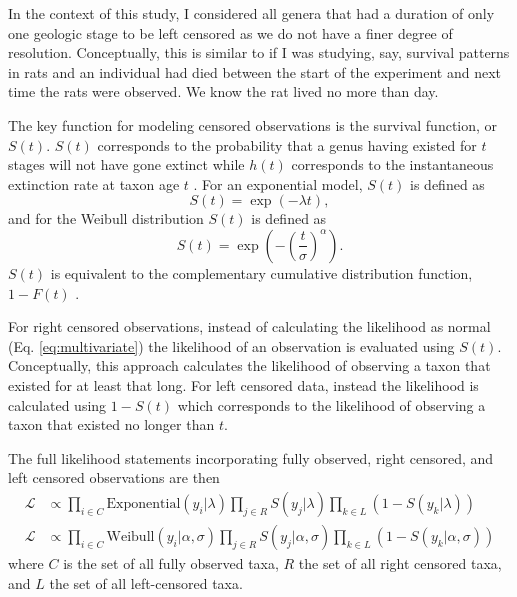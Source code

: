 \documentclass[12pt,letterpaper]{article}
\begin{document}
In the context of this study, I considered all genera that had a duration of only one geologic stage to be left censored as we do not have a finer degree of resolution. Conceptually, this is similar to if I was studying, say, survival patterns in rats and an individual had died between the start of the experiment and next time the rats were observed. We know the rat lived no more than day.

The key function for modeling censored observations is the survival function, or \(S(t)\). \(S(t)\) corresponds to the probability that a genus having existed for \(t\) stages will not have gone extinct while \(h(t)\) corresponds to the instantaneous extinction rate at taxon age \(t\) \cite{Klein2003}. For an exponential model, \(S(t)\) is defined as
\begin{equation}
  S(t) = \exp(-\lambda t),
  \label{eq:exp_surv}
\end{equation}
and for the Weibull distribution \(S(t)\) is defined as
\begin{equation}
  S(t) = \exp\left(-\left(\frac{t}{\sigma}\right)^{\alpha}\right).
  \label{eq:wei_surv}
\end{equation}
\(S(t)\) is equivalent to the complementary cumulative distribution function, \(1 - F(t)\) \citep{Klein2003}. 

For right censored observations, instead of calculating the likelihood as normal (Eq. \ref{eq:multivariate}) the likelihood of an observation is evaluated using \(S(t)\). Conceptually, this approach calculates the likelihood of observing a taxon that existed for at least that long. For left censored data, instead the likelihood is calculated using \(1 - S(t)\) which corresponds to the likelihood of observing a taxon that existed no longer than \(t\).

The full likelihood statements incorporating fully observed, right censored, and left censored observations are then
\begin{equation}
  \begin{aligned}
    \mathcal{L} &\propto \prod_{i \in C} \mathrm{Exponential}(y_{i} | \lambda) \prod_{j \in R} S(y_{j} | \lambda) \prod_{k \in L} \left(1 - S(y_{k} | \lambda)\right) \\
    \mathcal{L} &\propto \prod_{i \in C} \mathrm{Weibull}(y_{i} | \alpha, \sigma) \prod_{j \in R} S(y_{j} | \alpha, \sigma) \prod_{k \in L} \left(1 - S(y_{k} | \alpha, \sigma)\right)
  \end{aligned}
  \label{eq:censored_likelihood}
\end{equation}
where \(C\) is the set of all fully observed taxa, \(R\) the set of all right censored taxa, and \(L\) the set of all left-censored taxa.
\end{document}
